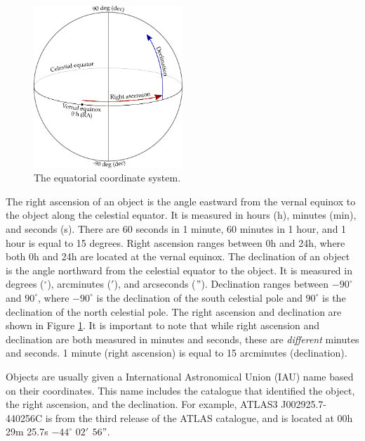             \begin{figure}[!ht]
                \centering
                \includegraphics[width=0.5\textwidth]{images/ra-dec}
                \caption{The equatorial coordinate system.}
                \label{fig:equatorial-coordinates}
            \end{figure}

            The right ascension of an object is the angle eastward from the vernal equinox to the object along the celestial equator. It is measured in hours (h), minutes (min), and seconds (s). There are 60 seconds in 1 minute, 60 minutes in 1 hour, and 1 hour is equal to 15 degrees. Right ascension ranges between 0h and 24h, where both 0h and 24h are located at the vernal equinox. The declination of an object is the angle northward from the celestial equator to the object. It is measured in degrees (${}^\circ$), arcminutes ($'$), and arcseconds ($"$). Declination ranges between $-90^\circ$ and $90^\circ$, where $-90^\circ$ is the declination of the south celestial pole and $90^\circ$ is the declination of the north celestial pole. The right ascension and declination are shown in Figure \ref{fig:equatorial-coordinates}. It is important to note that while right ascension and declination are both measured in minutes and seconds, these are \emph{different} minutes and seconds. 1 minute (right ascension) is equal to 15 arcminutes (declination).

            Objects are usually given a International Astronomical Union (IAU) name based on their coordinates. This name includes the catalogue that identified the object, the right ascension, and the declination. For example, ATLAS3 J002925.7-440256C is from the third release of the ATLAS catalogue, and is located at 00h 29m 25.7s $-44^\circ$ $02'$ $56"$.


